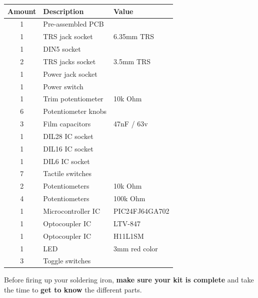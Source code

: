 \documentclass{scrartcl}
\begin{document}
\begin{center}
    \begin{tabular}{|c|l|l|}
        \hline
        \textbf{Amount} & \textbf{Description} & \textbf{Value} \\
        \hline
        1               & Pre-assembled PCB    &                \\
        1               & TRS jack socket      & 6.35mm TRS     \\
        1               & DIN5 socket          &                \\
        2               & TRS jacks socket     & 3.5mm TRS      \\
        1               & Power jack socket    &                \\
        1               & Power switch         &                \\
        1               & Trim potentiometer   & 10k Ohm        \\
        6               & Potentiometer knobs  &                \\
        3               & Film capacitors      & 47nF / 63v     \\
        1               & DIL28 IC socket      &                \\        
        1               & DIL16 IC socket      &                \\
        1               & DIL6 IC socket       &                \\
        7               & Tactile switches     &                \\
        2               & Potentiometers       & 10k Ohm        \\
        4               & Potentiometers       & 100k Ohm       \\
        1               & Microcontroller IC   & PIC24FJ64GA702 \\
        1               & Optocoupler IC       & LTV-847        \\
        1               & Optocoupler IC       & H11L1SM        \\
        1               & LED                  & 3mm red color  \\
        3               & Toggle switches      &                \\
        \hline
    \end{tabular}
\end{center}

\vspace{0.25cm}
Before firing up your soldering iron, \textbf{make sure your kit is complete} and take the time to \textbf{get to know} the different parts.
\end{document}
